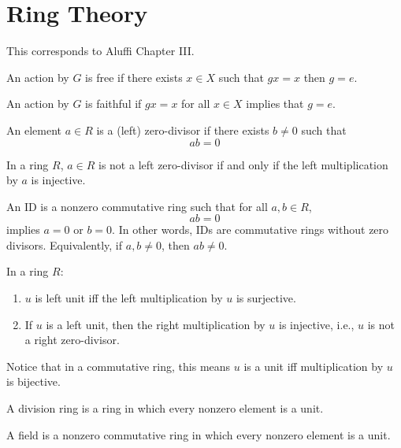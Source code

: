 \documentclass[openany]{book}
\begin{document}
\chapter{Ring Theory}
This corresponds to Aluffi Chapter III.

\begin{defn}
    An action by $G$ is free if there exists $x\in X$ such that $gx=x$ then $g=e$.
\end{defn}

\begin{defn}
    An action by $G$ is faithful if $gx=x$ for all $x\in X$ implies that $g=e$.
\end{defn}


\begin{defn}
    An element $a\in R$ is a (left) zero-divisor if there exists $b\neq 0$ such that 
    \begin{equation*}
        ab=0
    \end{equation*}
\end{defn}

\begin{prop}
    In a ring $R$, $a\in R$ is not a left zero-divisor if and only if the left multiplication by $a$ is injective.
\end{prop}

\begin{defn}
    An ID is a nonzero commutative ring such that for all $a,b\in R$, 
    \begin{equation*}
        ab=0
    \end{equation*}
    implies $a=0$ or $b=0$. In other words, IDs are commutative rings without zero divisors. Equivalently, if $a,b\neq 0$, then $ab\neq 0$.
\end{defn}


\begin{prop}
    In a ring $R$:
    \begin{enumerate}
        \item $u$ is left unit iff the left multiplication by $u$ is surjective. 
        \item If $u$ is a left unit, then the right multiplication by $u$ is injective, i.e., $u$ is not a right zero-divisor.
    \end{enumerate}
\end{prop}
Notice that in a commutative ring, this means $u$ is a unit iff multiplication by $u$ is bijective.

\begin{defn}
    A division ring is a ring in which every nonzero element is a unit.

    A field is a nonzero commutative ring in which every nonzero element is a unit.
\end{defn}
\end{document}
